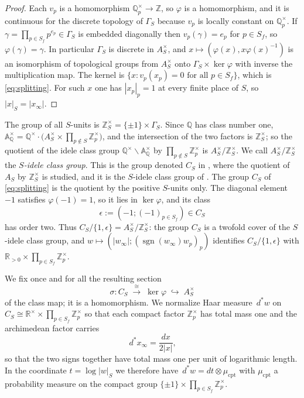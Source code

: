 \documentclass[11pt]{amsart}
\theoremstyle{definition}
\theoremstyle{remark}
\newcommand{\R}{\mathbb R}
\newcommand{\Z}{\mathbb Z}
\newcommand{\Q}{\mathbb Q}
\newcommand{\dstar}{\,d^{*}}
\newcommand{\sgn}{\operatorname{sgn}}
\begin{document}
\begin{proof}
Each $v_p$ is a homomorphism $\Q_p^{\times}\to\Z$, so $\varphi$ is a
homomorphism, and it is continuous for the discrete topology of $\Gamma_S$
because $v_p$ is locally constant on $\Q_p^{\times}$.  If
$\gamma=\prod_{p\in S_f}p^{e_p}\in\Gamma_S$ is embedded diagonally then
$v_p(\gamma)=e_p$ for $p\in S_f$, so $\varphi(\gamma)=\gamma$.  In particular
$\Gamma_S$ is discrete in $A_S^{\times}$, and
$x\mapsto(\varphi(x),x\varphi(x)^{-1})$ is an isomorphism of topological groups
from $A_S^{\times}$ onto $\Gamma_S\times\ker\varphi$ with inverse the
multiplication map.  The kernel is
$\{x: v_p(x_p)=0\text{ for all }p\in S_f\}$, which is \eqref{eq:splitting}.
For such $x$ one has $|x_p|_p=1$ at every finite place of $S$, so
$|x|_S=|x_{\infty}|$.
\end{proof}

The group of all $S$-units is $\Z_S^{\times}=\{\pm1\}\times\Gamma_S$.  Since
$\Q$ has class number one, $\mathbb A_{\Q}^{\times}=\Q^{\times}\cdot
\bigl(A_S^{\times}\times\prod_{p\notin S}\Z_p^{\times}\bigr)$, and the
intersection of the two factors is $\Z_S^{\times}$; so the quotient of the
idele class group $\Q^{\times}\backslash\mathbb A_{\Q}^{\times}$ by
$\prod_{p\notin S}\Z_p^{\times}$ is $A_S^{\times}/\Z_S^{\times}$.  We call
$A_S^{\times}/\Z_S^{\times}$ the \emph{$S$-idele class group}.
This is the group denoted $C_S$ in \cite[Section~VII]{Connes99}, where the
quotient of $A_S$ by $\Z_S^{\times}$ is studied, and it is the $S$-idele
class group of \cite[Section~3]{MeyerIdele}.
The group $C_S$ of \eqref{eq:splitting} is the quotient by the positive
$S$-units only.  The diagonal element $-1$ satisfies $\varphi(-1)=1$, so it
lies in $\ker\varphi$, and its class
\begin{equation}\label{eq:epsclass}
\epsilon:=(-1;(-1)_{p\in S_f})\in C_S
\end{equation}
has order two.  Thus $C_S/\{1,\epsilon\}=A_S^{\times}/\Z_S^{\times}$: the
group $C_S$ is a twofold cover of the $S$-idele class group, and
$w\mapsto(|w_{\infty}|;(\sgn(w_{\infty})w_p)_p)$ identifies
$C_S/\{1,\epsilon\}$ with $\R_{>0}\times\prod_{p\in S_f}\Z_p^{\times}$.

We fix once and for all the resulting section
\begin{equation}\label{eq:section}
\sigma: C_S\;\xrightarrow{\ \cong\ }\;\ker\varphi\;\hookrightarrow\;A_S^{\times}
\end{equation}
of the class map; it is a homomorphism.  We normalize Haar measure
$\dstar w$ on $C_S\cong\R^{\times}\times\prod_{p\in S_f}\Z_p^{\times}$ so that
each compact factor $\Z_p^{\times}$ has total mass one and the archimedean
factor carries
\begin{equation}\label{eq:archmeasure}
\dstar x_{\infty}=\frac{dx}{2|x|},
\end{equation}
so that the two signs together have total mass one per unit of logarithmic
length.  In the coordinate $t=\log|w|_S$ we therefore have
$\dstar w=dt\otimes\mu_{\mathrm{cpt}}$ with $\mu_{\mathrm{cpt}}$ a probability
measure on the compact group $\{\pm1\}\times\prod_{p\in S_f}\Z_p^{\times}$.
\end{document}
